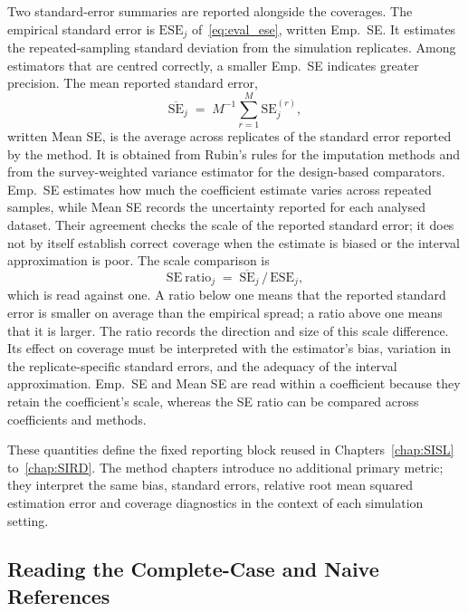 Two standard-error summaries are reported alongside the coverages. The empirical standard error is $\mathrm{ESE}_j$ of~\eqref{eq:eval_ese}, written Emp.\ SE. It estimates the repeated-sampling standard deviation from the simulation replicates. Among estimators that are centred correctly, a smaller Emp.\ SE indicates greater precision. The mean reported standard error,
\begin{equation}
    \overline{\mathrm{SE}}_j \;=\; M^{-1}\sum_{r=1}^{M} \mathrm{SE}^{(r)}_j,
    \label{eq:eval_meanse}
\end{equation}
written Mean SE, is the average across replicates of the standard error reported by the method. It is obtained from Rubin's rules for the imputation methods and from the survey-weighted variance estimator for the design-based comparators. Emp.\ SE estimates how much the coefficient estimate varies across repeated samples, while Mean SE records the uncertainty reported for each analysed dataset. Their agreement checks the scale of the reported standard error; it does not by itself establish correct coverage when the estimate is biased or the interval approximation is poor. The scale comparison is
\begin{equation}
    \mathrm{SE\ ratio}_j \;=\; \overline{\mathrm{SE}}_j \,/\, \mathrm{ESE}_j ,
    \label{eq:eval_seratio}
\end{equation}
which is read against one. A ratio below one means that the reported standard error is smaller on average than the empirical spread; a ratio above one means that it is larger. The ratio records the direction and size of this scale difference. Its effect on coverage must be interpreted with the estimator's bias, variation in the replicate-specific standard errors, and the adequacy of the interval approximation. Emp.\ SE and Mean SE are read within a coefficient because they retain the coefficient's scale, whereas the SE ratio can be compared across coefficients and methods.

These quantities define the fixed reporting block reused in Chapters~\ref{chap:SISL} to~\ref{chap:SIRD}. The method chapters introduce no additional primary metric; they interpret the same bias, standard errors, relative root mean squared estimation error and coverage diagnostics in the context of each simulation setting.

\subsection{Reading the Complete-Case and Naive References}
\label{sec:cc_reference}

